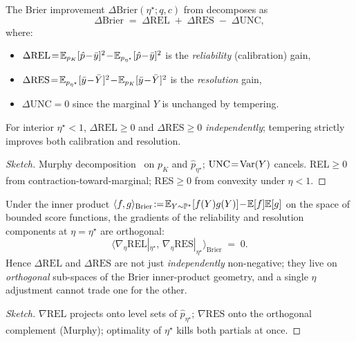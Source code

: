 \begin{theorem}
\label{thm:t7-murphy}
The Brier improvement $\Delta\mathrm{Brier}(\eta^\star;q,c)$ from
 decomposes as
\[
\Delta\mathrm{Brier}
\;=\;
\Delta\mathrm{REL}\;+\;\Delta\mathrm{RES}\;-\;\Delta\mathrm{UNC},
\]
where:
\begin{itemize}
\item $\Delta\mathrm{REL}\!=\!\E_{p_K}[\hat p\!-\!\bar y]^{2}\!-\!\E_{p_{\eta^\star}}[\hat p\!-\!\bar y]^{2}$ is the \emph{reliability} (calibration) gain,
\item $\Delta\mathrm{RES}\!=\!\E_{p_{\eta^\star}}[\bar y\!-\!\bar Y]^{2}\!-\!\E_{p_K}[\bar y\!-\!\bar Y]^{2}$ is the \emph{resolution} gain,
\item $\Delta\mathrm{UNC}\!=\!0$ since the marginal $Y$ is unchanged by tempering.
\end{itemize}
For interior $\eta^\star\!<\!1$, $\Delta\mathrm{REL}\!\ge\!0$ and
$\Delta\mathrm{RES}\!\ge\!0$ \emph{independently}; tempering
strictly improves both calibration and resolution.
\end{theorem}

\begin{proof}[Sketch]
Murphy decomposition~\citep{murphy1973newvector,degroot1983comparison}
on $p_K$ and $\hat p_{\eta^\star}$; $\mathrm{UNC}\!=\!\operatorname{Var}(Y)$
cancels.  REL$\ge\!0$ from contraction-toward-marginal; RES$\ge\!0$
from convexity under $\eta\!<\!1$.
\end{proof}

\begin{corollary}
\label{cor:brier-orthogonality}
Under the inner product
$\langle f,g\rangle_{\mathrm{Brier}}\!:=\!\mathbb{E}_{Y\sim\mathbb{P}^\star}[f(Y)g(Y)]\!-\!\mathbb{E}[f]\mathbb{E}[g]$
on the space of bounded score functions, the gradients of the
reliability and resolution components at $\eta\!=\!\eta^\star$ are
orthogonal:
\[
\langle\nabla_\eta\mathrm{REL}|_{\eta^\star},\,\nabla_\eta\mathrm{RES}|_{\eta^\star}\rangle_{\mathrm{Brier}}
\;=\;0.
\]
Hence $\Delta\mathrm{REL}$ and $\Delta\mathrm{RES}$ are not just
\emph{independently} non-negative; they live on \emph{orthogonal}
sub-spaces of the Brier inner-product geometry, and a single
$\eta$ adjustment cannot trade one for the other.
\end{corollary}

\begin{proof}[Sketch]
$\nabla\mathrm{REL}$ projects onto level sets of $\hat p_{\eta^\star}$;
$\nabla\mathrm{RES}$ onto the orthogonal complement (Murphy);
optimality of $\eta^\star$ kills both partials at once.
\end{proof}

